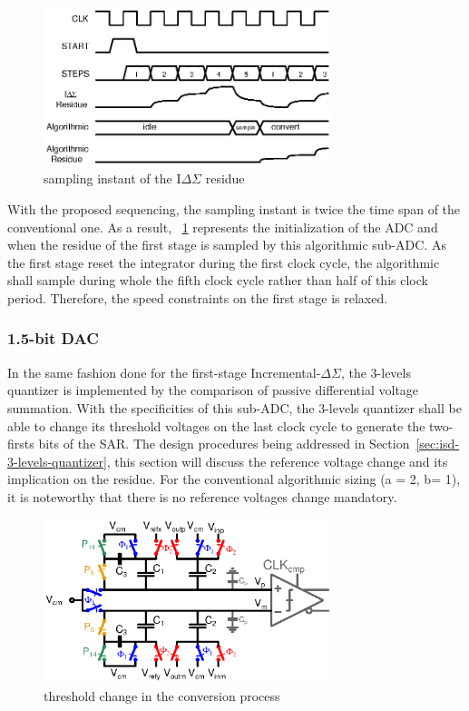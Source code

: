 \begin{figure}[htp]
	\centering
	\includegraphics[width=0.75\textwidth]{Chapter4/Figs/isd-algo-residue-sampling.ps}
	\caption{sampling instant of the I\(\Delta \Sigma \) residue}
	\label{fig:digital-sampling}
\end{figure}

With the proposed sequencing, the sampling instant is twice the time span of the conventional one. As a result, \figurename~\ref{fig:digital-sampling} represents the initialization of the ADC and when the residue of the first stage is sampled by this algorithmic sub-ADC\@. As the first stage reset the integrator during the first clock cycle, the algorithmic shall sample during whole the fifth clock cycle rather than half of this clock period. Therefore, the speed constraints on the first stage is relaxed.

	\subsubsection{1.5-bit DAC}             %
In the same fashion done for the first-stage Incremental-\(\Delta\Sigma \), the 3-levels quantizer is implemented by the comparison of passive differential voltage summation. With the specificities of this sub-ADC, the 3-levels quantizer shall be able to change its threshold voltages on the last clock cycle to generate the two-firsts bits of the SAR\@. The design procedures being addressed in Section~\ref{sec:isd-3-levels-quantizer}, this section will discuss the reference voltage change and its implication on the residue. For the conventional algorithmic sizing (a = 2, b= 1), it is noteworthy that there is no reference voltages change mandatory.

\begin{figure}[htp]
	\centering
	\includegraphics[width=0.75\textwidth]{Chapter4/Figs/algo-passive-adder-comp.ps}
	\caption{threshold change in the conversion process}
	\label{fig:thresholds-generator}
\end{figure}

